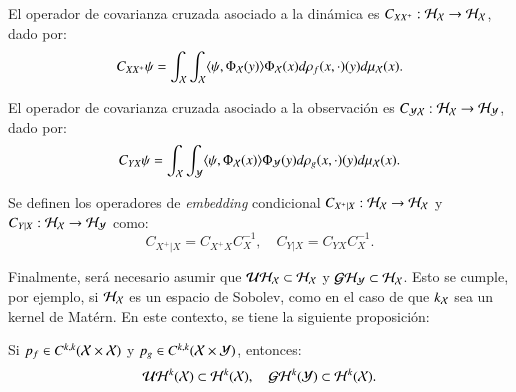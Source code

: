 \begin{defn}
    El operador de covarianza cruzada asociado a la dinámica es $C_{X X^+} : \mathcal{H}_{\mathcal{X}} \to \mathcal{H}_{\mathcal{X}}$, dado por:
	\begin{equation*}
		C_{X X^+} \psi = \int_{\mathcal{X}} \int_{\mathcal{X}} \langle \psi, \Phi_{\mathcal{X}} (y) \rangle \Phi_{\mathcal{X}} (x) d\rho_f (x, \cdot)(y) d \mu_{\mathcal{X}} (x).
	\end{equation*}
    
    El operador de covarianza cruzada asociado a la observación es $C_{\mathcal{Y} \mathcal{X}} : \mathcal{H}_{\mathcal{X}} \to \mathcal{H}_{\mathcal{Y}}$, dado por:
	\begin{equation*}
		C_{Y X} \psi = \int_{\mathcal{X}} \int_{\mathcal{Y}} \langle \psi, \Phi_{\mathcal{X}} (x) \rangle \Phi_{\mathcal{Y}} (y) d\rho_g (x, \cdot)(y) d \mu_{\mathcal{X}} (x).
	\end{equation*}
\end{defn}

\begin{defn}   
    Se definen los operadores de \textit{embedding} condicional $C_{X^+ | X} : \mathcal{H}_{\mathcal{X}} \to \mathcal{H}_{\mathcal{X}}$ y $C_{Y | X} : \mathcal{H}_{\mathcal{X}} \to \mathcal{H}_{\mathcal{Y}}$ como:
	\begin{equation*}
		C_{X^+ | X} = C_{X^+ X} C_X^{-1}, \quad C_{Y | X} = C_{Y X} C_X^{-1}.
	\end{equation*}
\end{defn}

Finalmente, será necesario asumir que $\mathcal{U} \mathcal{H}_{\mathcal{X}} \subset \mathcal{H}_{\mathcal{X}}$ y $\mathcal{G} \mathcal{H}_{\mathcal{Y}} \subset \mathcal{H}_{\mathcal{X}}$. Esto se cumple, por ejemplo, si $\mathcal{H}_{\mathcal{X}}$ es un espacio de Sobolev, como en el caso de que $k_{\mathcal{X}}$ sea un kernel de Matérn. En este contexto, se tiene la siguiente proposición:

\begin{prop}
	Si $p_f \in C^{k,k} (\mathcal{X} \times \mathcal{X})$ y $p_g \in C^{k,k} (\mathcal{X} \times \mathcal{Y})$, entonces:
	\begin{equation*}
		\mathcal{U} \mathcal{H}^k (\mathcal{X}) \subset \mathcal{H}^k (\mathcal{X}), \quad \mathcal{G} \mathcal{H}^k (\mathcal{Y}) \subset \mathcal{H}^k (\mathcal{X}).
	\end{equation*}
\end{prop}

